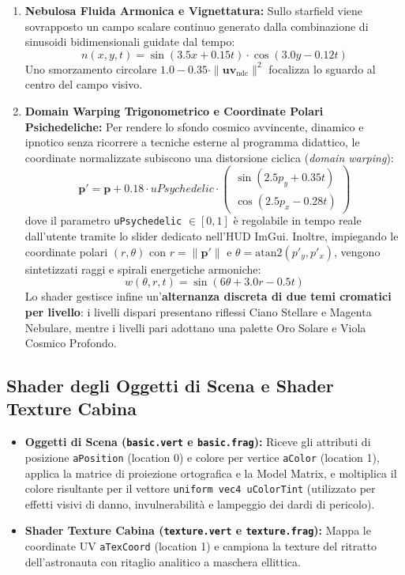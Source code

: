 \documentclass[11pt,a4paper]{article}
\begin{document}
\begin{enumerate}
    \item \textbf{Nebulosa Fluida Armonica e Vignettatura:}
    Sullo starfield viene sovrapposto un campo scalare continuo generato dalla combinazione di sinusoidi bidimensionali guidate dal tempo:
    \begin{equation}
    n(x, y, t) = \sin(3.5x + 0.15t) \cdot \cos(3.0y - 0.12t)
    \end{equation}
    Uno smorzamento circolare $1.0 - 0.35 \cdot \|\mathbf{uv}_{\text{ndc}}\|^2$ focalizza lo sguardo al centro del campo visivo.

    \item \textbf{Domain Warping Trigonometrico e Coordinate Polari Psichedeliche:}
    Per rendere lo sfondo cosmico avvincente, dinamico e ipnotico senza ricorrere a tecniche esterne al programma didattico, le coordinate normalizzate subiscono una distorsione ciclica (\textit{domain warping}):
    \begin{equation}
    \mathbf{p}' = \mathbf{p} + 0.18 \cdot uPsychedelic \cdot \begin{pmatrix} \sin(2.5 p_y + 0.35 t) \\ \cos(2.5 p_x - 0.28 t) \end{pmatrix}
    \end{equation}
    dove il parametro \texttt{uPsychedelic} $\in [0, 1]$ è regolabile in tempo reale dall'utente tramite lo slider dedicato nell'HUD ImGui. Inoltre, impiegando le coordinate polari $(r, \theta)$ con $r = \|\mathbf{p}'\|$ e $\theta = \text{atan2}(p'_y, p'_x)$, vengono sintetizzati raggi e spirali energetiche armoniche:
    \begin{equation}
    w(\theta, r, t) = \sin(6\theta + 3.0r - 0.5t)
    \end{equation}
    Lo shader gestisce infine un'\textbf{alternanza discreta di due temi cromatici per livello}: i livelli dispari presentano riflessi Ciano Stellare e Magenta Nebulare, mentre i livelli pari adottano una palette Oro Solare e Viola Cosmico Profondo.
\end{enumerate}

\subsection{Shader degli Oggetti di Scena e Shader Texture Cabina}
\begin{itemize}
    \item \textbf{Oggetti di Scena (\texttt{basic.vert} e \texttt{basic.frag}):} Riceve gli attributi di posizione \texttt{aPosition} (location 0) e colore per vertice \texttt{aColor} (location 1), applica la matrice di proiezione ortografica e la Model Matrix, e moltiplica il colore risultante per il vettore \texttt{uniform vec4 uColorTint} (utilizzato per effetti visivi di danno, invulnerabilità e lampeggio dei dardi di pericolo).
    \item \textbf{Shader Texture Cabina (\texttt{texture.vert} e \texttt{texture.frag}):} Mappa le coordinate UV \texttt{aTexCoord} (location 1) e campiona la texture del ritratto dell'astronauta con ritaglio analitico a maschera ellittica.
\end{itemize}
\end{document}
